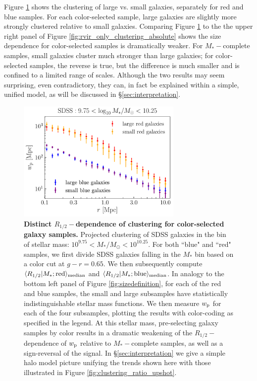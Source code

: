 \documentclass[usenatbib,usegraphicx,letterpaper]{mn2e}
\newcommand{\rhalf}{R_{1/2}}
\newcommand{\mstar}{M_{\ast}}
\newcommand{\wproj}{w_{\rm p}}
\newcommand{\median}[2]{\langle{#1}\vert{#2}\rangle_{\rm median}}
\newcommand{\msun}{M_\odot}
\begin{document}
Figure \ref{fig:colorclustering} shows the clustering of large vs. small galaxies, separately for red and blue samples. For each color-selected sample, large galaxies are slightly more strongly clustered relative to small galaxies. Comparing Figure \ref{fig:colorclustering} to the the upper right panel of Figure \ref{fig:rvir_only_clustering_absolute} shows the size dependence for color-selected samples is dramatically weaker.   For $\mstar-$complete samples, small galaxies cluster much stronger than large galaxies; for color-selected samples, the reverse is true, but the difference is much smaller and is confined to a limited range of scales.  Although the two results may seem surprising, even contradictory, they can, in fact be explained within a simple, unified model, as will be discussed in \S\ref{sec:interpretation}.

\begin{figure}
\centering
\includegraphics[width=8cm]{FIGS/color_selected_size_dependent_clustering.pdf}
\caption{
{\bf Distinct $\rhalf-$dependence of clustering for color-selected galaxy samples.}
Projected clustering of SDSS galaxies in the bin of stellar mass: $10^{9.75}<\mstar/\msun<10^{10.25}.$ For both ``blue" and ``red" samples, we first divide SDSS galaxies falling in the $\mstar$ bin based on a color cut at $g-r=0.65.$ We then subsequently compute $\median{\rhalf}{\mstar; {\rm red}}$ and $\median{\rhalf}{\mstar; {\rm blue}}$. In analogy to the bottom left panel of Figure \ref{fig:sizedefinition}, for each of the red and blue samples, the small and large subsamples have statistically indistinguishable stellar mass functions. We then measure $\wproj$ for each of the four subsamples, plotting the results with color-coding as specified in the legend. At this stellar mass, pre-selecting galaxy samples by color results in a dramatic weakening of the $\rhalf-$dependence of $\wproj$ relative to $\mstar-$complete samples, as well as a sign-reversal of the signal. In \S\ref{sec:interpretation} we give a simple halo model picture unifying the trends shown here with those illustrated in Figure \ref{fig:clustering_ratio_upshot}.
}
\label{fig:colorclustering}
\end{figure}
\end{document}

